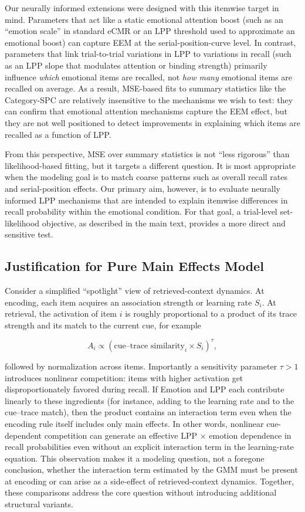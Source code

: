 \documentclass[
  letterpaper,
  DIV=11,
  numbers=noendperiod]{scrartcl}
\begin{document}
Our neurally informed extensions were designed with this itemwise target
in mind. Parameters that act like a static emotional attention boost
(such as an ``emotion scale'' in standard eCMR or an LPP threshold used
to approximate an emotional boost) can capture EEM at the
serial-position-curve level. In contrast, parameters that link
trial-to-trial variations in LPP to variations in recall (such as an LPP
slope that modulates attention or binding strength) primarily influence
\emph{which} emotional items are recalled, not \emph{how many} emotional
items are recalled on average. As a result, MSE-based fits to summary
statistics like the Category-SPC are relatively insensitive to the
mechanisms we wish to test: they can confirm that emotional attention
mechanisms capture the EEM effect, but they are not well positioned to
detect improvements in explaining which items are recalled as a function
of LPP.

From this perspective, MSE over summary statistics is not ``less
rigorous'' than likelihood-based fitting, but it targets a different
question. It is most appropriate when the modeling goal is to match
coarse patterns such as overall recall rates and serial-position
effects. Our primary aim, however, is to evaluate neurally informed LPP
mechanisms that are intended to explain itemwise differences in recall
probability within the emotional condition. For that goal, a trial-level
set-likelihood objective, as described in the main text, provides a more
direct and sensitive test.

\subsection{Justification for Pure Main Effects
Model}\label{justification-for-pure-main-effects-model}

Consider a simplified ``spotlight'' view of retrieved-context dynamics.
At encoding, each item acquires an association strength or learning rate
\(S_i\). At retrieval, the activation of item \(i\) is roughly
proportional to a product of its trace strength and its match to the
current cue, for example

\[
A_i \propto (\text{cue–trace similarity}_i \times S_i)^\tau,
\]

followed by normalization across items. Importantly a sensitivity
parameter \(\tau > 1\) introduces nonlinear competition: items with
higher activation get disproportionately favored during recall. If
Emotion and LPP each contribute linearly to these ingredients (for
instance, adding to the learning rate and to the cue--trace match), then
the product contains an interaction term even when the encoding rule
itself includes only main effects. In other words, nonlinear
cue-dependent competition can generate an effective LPP × emotion
dependence in recall probabilities even without an explicit interaction
term in the learning-rate equation. This observation makes it a modeling
question, not a foregone conclusion, whether the interaction term
estimated by the GMM must be present at encoding or can arise as a
side-effect of retrieved-context dynamics. Together, these comparisons
address the core question without introducing additional structural
variants.
\end{document}
